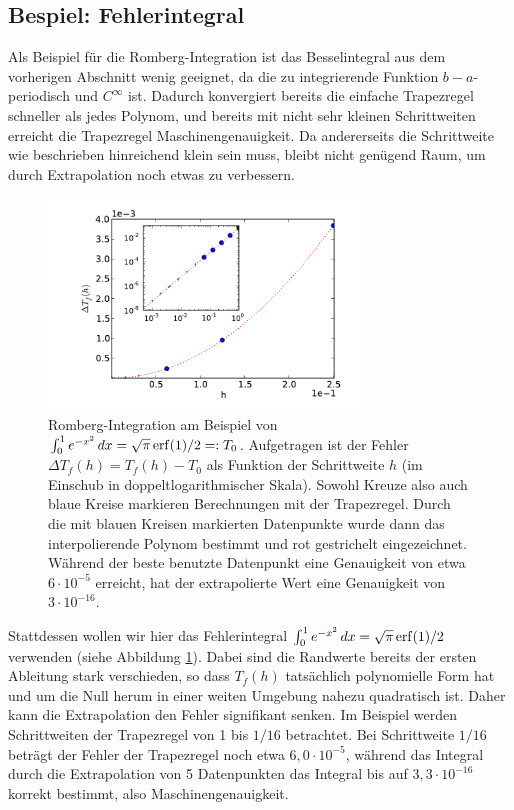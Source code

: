 \subsection{Bespiel: Fehlerintegral}

Als Beispiel für die Romberg-Integration ist das Besselintegral aus
dem vorherigen Abschnitt wenig geeignet, da die zu integrierende
Funktion $b-a$-periodisch und $C^\infty$ ist. Dadurch konvergiert
bereits die einfache Trapezregel schneller als jedes Polynom, und
bereits mit nicht sehr kleinen Schrittweiten erreicht die Trapezregel
Maschinengenauigkeit. Da andererseits die Schrittweite wie beschrieben
hinreichend klein sein muss, bleibt nicht genügend Raum, um durch
Extrapolation noch etwas zu verbessern. 

\begin{figure}
  \centering
  \includegraphics[width=0.75\textwidth]{plots/romberg}
  \caption{Romberg-Integration am Beispiel von $\int_0^1 e^{-x^2}\,dx
    = \sqrt{\pi}\operatorname{erf}(1)/2 =: T_0$. Aufgetragen ist der Fehler $\Delta
    T_f(h) = T_f(h) - T_0$ als Funktion der Schrittweite $h$ (im Einschub
    in doppeltlogarithmischer Skala). Sowohl Kreuze also auch blaue
    Kreise markieren Berechnungen mit der Trapezregel. Durch die mit
    blauen Kreisen markierten Datenpunkte wurde dann das
    interpolierende Polynom bestimmt und rot gestrichelt
    eingezeichnet. Während der beste benutzte Datenpunkt eine
    Genauigkeit von etwa $6\cdot10^{-5}$ erreicht, hat der
    extrapolierte Wert eine Genauigkeit von $3\cdot 10^{-16}$.  }
  \label{fig:romberg}
\end{figure}

Stattdessen wollen wir hier das Fehlerintegral $\int_0^1 e^{-x^2}\,dx
= \sqrt{\pi}\operatorname{erf}(1)/2$ verwenden (siehe Abbildung \ref{fig:romberg}).
Dabei sind die Randwerte bereits der ersten Ableitung stark
verschieden, so dass $T_f(h)$ tatsächlich polynomielle Form hat und um
die Null herum in einer weiten Umgebung nahezu quadratisch ist. Daher
kann die Extrapolation den Fehler signifikant senken.  Im Beispiel
werden Schrittweiten der Trapezregel von 1 bis $1/16$ betrachtet. Bei
Schrittweite $1/16$ beträgt der Fehler der Trapezregel noch etwa
$6,0\cdot 10^{-5}$, während das Integral durch die Extrapolation von 5
Datenpunkten das Integral bis auf $3,3\cdot 10^{-16}$ korrekt
bestimmt, also Maschinengenauigkeit.

